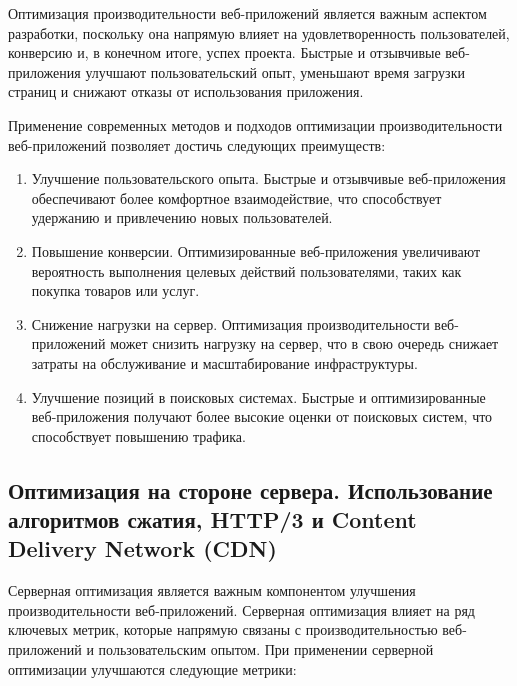 Оптимизация производительности веб-приложений является важным аспектом разработки, поскольку она напрямую влияет на удовлетворенность пользователей, конверсию и, в конечном итоге, успех проекта. Быстрые и отзывчивые веб-приложения улучшают пользовательский опыт, уменьшают время загрузки страниц и снижают отказы от использования приложения.

Применение современных методов и подходов оптимизации производительности веб-приложений позволяет достичь следующих преимуществ:

\begin{enumerate} 
  \item Улучшение пользовательского опыта. Быстрые и отзывчивые веб-приложения обеспечивают более комфортное взаимодействие, что способствует удержанию и привлечению новых пользователей.
  
  \item Повышение конверсии. Оптимизированные веб-приложения увеличивают вероятность выполнения целевых действий пользователями, таких как покупка товаров или услуг.

  \item Снижение нагрузки на сервер. Оптимизация производительности веб-приложений может снизить нагрузку на сервер, что в свою очередь снижает затраты на обслуживание и масштабирование инфраструктуры.

  \item Улучшение позиций в поисковых системах. Быстрые и оптимизированные веб-приложения получают более высокие оценки от поисковых систем, что способствует повышению трафика.
\end{enumerate}

\subsection{Оптимизация на стороне сервера. Использование алгоритмов сжатия, HTTP/3 и Content Delivery Network (CDN)}

Серверная оптимизация является важным компонентом улучшения производительности веб-приложений. Серверная оптимизация влияет на ряд ключевых метрик, которые напрямую связаны с производительностью веб-приложений и пользовательским опытом. При применении серверной оптимизации улучшаются следующие метрики:

